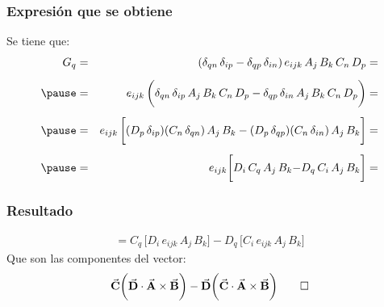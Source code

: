 \documentclass[12pt]{beamer}
\begin{document}
\begin{frame}
\frametitle{Expresión que se obtiene}
Se tiene que:
\pause
\begin{eqnarray*}
\!\!
G_{q} &=& (\delta_{qn} \, \delta_{ip} - \delta_{qp} \, \delta_{in}) \, e_{ijk} \, A_{j} \, B_{k} \, C_{n} \, D_{p} = \\[0.5em] \pause
&=& e_{ijk} \, \bigg( \delta_{qn} \, \delta_{ip} \, A_{j} \, B_{k} \, C_{n} \, D_{p} - \delta_{qp} \, \delta_{in} \, A_{j} \, B_{k} \, C_{n} \, D_{p} \bigg) = \\[0.5em] \pause
&=& e_{ijk} \, \bigg[ (D_{p} \, \delta_{ip}) (C_{n} \, \delta_{qn}) \, A_{j} \, B_{k} - (D_{p} \, \delta_{qp}) (C_{n} \, \delta_{in}) \, A_{j} \, B_{k} \bigg] = \\[0.5em] \pause
&=& e_{ijk} \bigg[ D_{i} \, C_{q} \, A_{j} \, B_{k} {-} D_{q} \, C_{i} \, A_{j} \, B_{k} \bigg] =
\end{eqnarray*}
\end{frame}
\begin{frame}
\frametitle{Resultado}
\begin{align*}
= C_{q} \, \bigg[ D_{i} \, e_{ijk} \, A_{j} \, B_{k} \bigg] - D_{q} \, \bigg[ C_{i} \, e_{ijk} \, A_{j} \, B_{k} \bigg]
\end{align*}
\pause
Que son las componentes del vector:
\pause
\begin{align*}
\va{C} \bigg( \va{D} \cdot \va{A} \times \va{B} \bigg) - \va{D} \bigg( \va{C} \cdot \va{A} \times \va{B} \bigg) \qed
\end{align*}
\end{frame}
\end{document}
